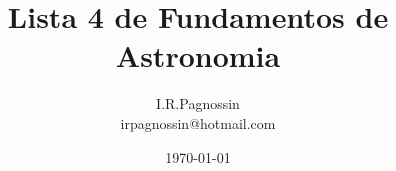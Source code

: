 \documentclass[a4paper,10pt]{article}
\begin{document}
\pagestyle{myheadings}
\renewcommand{\thefootnote}{\fnsymbol{footnote}}	

\title {Lista 4 de Fundamentos de Astronomia}  
\author {I.R.Pagnossin \\ irpagnossin@hotmail.com}
\date {\today}
\maketitle



\end{document}
